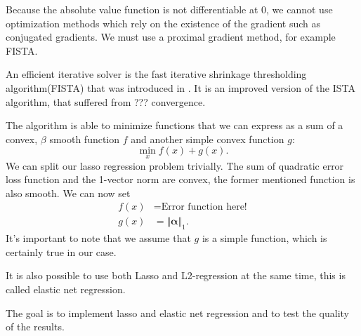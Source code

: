 Because the absolute value function is not differentiable at \(0\), we cannot use
optimization methods which rely on the existence of the gradient such as
conjugated gradients.
We must use a proximal gradient method, for example FISTA.

An efficient iterative solver is the fast iterative shrinkage thresholding
algorithm(FISTA) that was introduced in \cite{fista}.
It is an improved version of the ISTA algorithm, that suffered from ???
convergence.

The algorithm is able to minimize functions that we can express as a sum of a
convex, \(\beta\) smooth function \(f\) and another simple convex function
\(g\):
\begin{equation}
\min_x f(x) + g(x). 
\end{equation}
We can split our lasso regression problem trivially.
The sum of quadratic error loss function and the 1-vector norm are convex, the
former mentioned function is also smooth. 
We can now set
\begin{align*}
f(x) & = \text{Error function here!} \\ 
g(x) & = \Vert \bm{\alpha} \Vert_1.
\end{align*}
It's important to note that we assume that \(g\) is a simple function, which is
certainly true in our case.

It is also possible to use both Lasso and L2-regression at the same time, this is called elastic net regression.

The goal is to implement lasso and elastic net regression and to test the
quality of the results.

